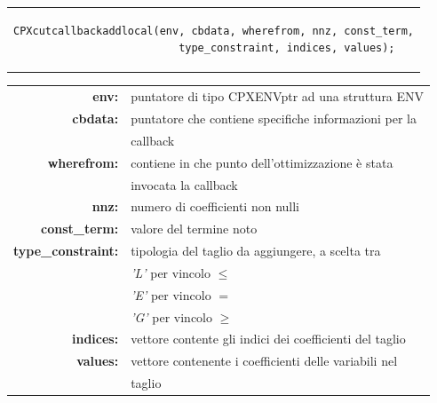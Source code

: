 \begin{center}
\begin{tabular}{c}
\begin{lstlisting}[linewidth=380pt, basicstyle=\footnotesize\sffamily,]  
CPXcutcallbackaddlocal(env, cbdata, wherefrom, nnz, const_term,
                       type_constraint, indices, values);
\end{lstlisting}
\end{tabular}
\end{center}
\begin{table}[h]
\centering
\begin{tabular}{rl}
\textbf{env:} & {puntatore di tipo CPXENVptr ad una struttura ENV}\\
\textbf{cbdata:} & {puntatore che contiene specifiche informazioni per la}\\
&{callback}\\
\textbf{wherefrom:} & {contiene in che punto dell'ottimizzazione è stata} \\ 
&{invocata la callback}\\
\textbf{nnz:} & {numero di coefficienti non nulli} \\
\textbf{const\_term:} & {valore del termine noto} \\
\textbf{type\_constraint:} & {tipologia del taglio da aggiungere, a scelta tra} \\
&{\textit{'L'} per vincolo $\leq$}\\
&{\textit{'E'} per vincolo $=$}\\
&{\textit{'G'} per vincolo $\geq$}\\
\textbf{indices:} & {vettore contente gli indici dei coefficienti del taglio} \\
\textbf{values:} & {vettore contenente i coefficienti delle variabili nel} \\
&{taglio}\\
\end{tabular}
\end{table}

